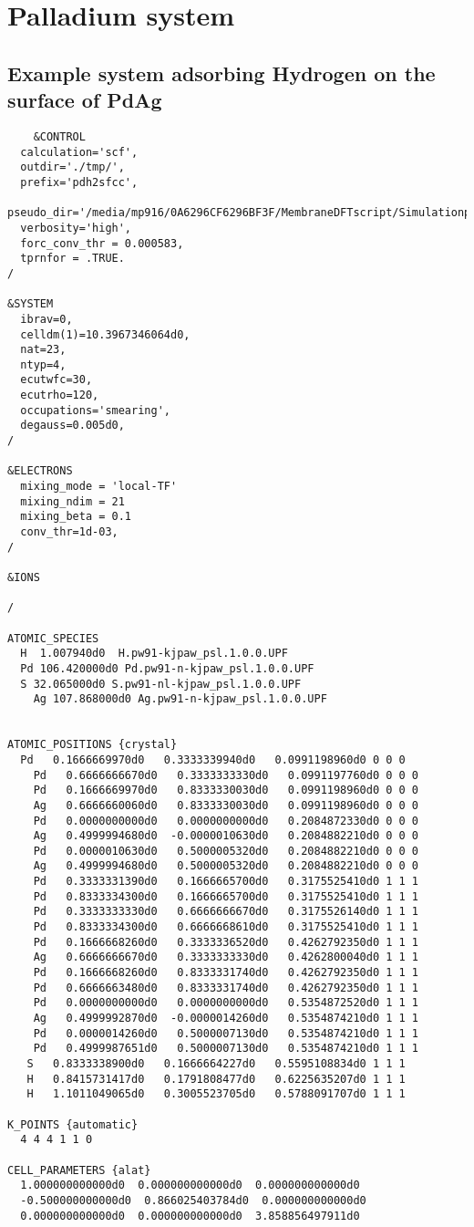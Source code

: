 \section{Palladium system}
\subsection{Example system adsorbing Hydrogen on the surface of PdAg }
\begin{verbatim}
    &CONTROL
  calculation='scf',
  outdir='./tmp/',
  prefix='pdh2sfcc',
  pseudo_dir='/media/mp916/0A6296CF6296BF3F/MembraneDFTscript/Simulationpdpaper/Pseudo',
  verbosity='high',
  forc_conv_thr = 0.000583,
  tprnfor = .TRUE.
/

&SYSTEM
  ibrav=0,
  celldm(1)=10.3967346064d0,
  nat=23,
  ntyp=4,
  ecutwfc=30,
  ecutrho=120,
  occupations='smearing',
  degauss=0.005d0,
/

&ELECTRONS
  mixing_mode = 'local-TF'
  mixing_ndim = 21
  mixing_beta = 0.1
  conv_thr=1d-03,
/

&IONS

/

ATOMIC_SPECIES
  H  1.007940d0  H.pw91-kjpaw_psl.1.0.0.UPF
  Pd 106.420000d0 Pd.pw91-n-kjpaw_psl.1.0.0.UPF
  S 32.065000d0 S.pw91-nl-kjpaw_psl.1.0.0.UPF
    Ag 107.868000d0 Ag.pw91-n-kjpaw_psl.1.0.0.UPF


ATOMIC_POSITIONS {crystal}
  Pd   0.1666669970d0   0.3333339940d0   0.0991198960d0 0 0 0
    Pd   0.6666666670d0   0.3333333330d0   0.0991197760d0 0 0 0
    Pd   0.1666669970d0   0.8333330030d0   0.0991198960d0 0 0 0
    Ag   0.6666660060d0   0.8333330030d0   0.0991198960d0 0 0 0
    Pd   0.0000000000d0   0.0000000000d0   0.2084872330d0 0 0 0
    Ag   0.4999994680d0  -0.0000010630d0   0.2084882210d0 0 0 0
    Pd   0.0000010630d0   0.5000005320d0   0.2084882210d0 0 0 0
    Ag   0.4999994680d0   0.5000005320d0   0.2084882210d0 0 0 0
    Pd   0.3333331390d0   0.1666665700d0   0.3175525410d0 1 1 1 
    Pd   0.8333334300d0   0.1666665700d0   0.3175525410d0 1 1 1
    Pd   0.3333333330d0   0.6666666670d0   0.3175526140d0 1 1 1
    Pd   0.8333334300d0   0.6666668610d0   0.3175525410d0 1 1 1 
    Pd   0.1666668260d0   0.3333336520d0   0.4262792350d0 1 1 1
    Ag   0.6666666670d0   0.3333333330d0   0.4262800040d0 1 1 1
    Pd   0.1666668260d0   0.8333331740d0   0.4262792350d0 1 1 1
    Pd   0.6666663480d0   0.8333331740d0   0.4262792350d0 1 1 1
    Pd   0.0000000000d0   0.0000000000d0   0.5354872520d0 1 1 1
    Ag   0.4999992870d0  -0.0000014260d0   0.5354874210d0 1 1 1
    Pd   0.0000014260d0   0.5000007130d0   0.5354874210d0 1 1 1
    Pd   0.4999987651d0   0.5000007130d0   0.5354874210d0 1 1 1 
   S   0.8333338900d0   0.1666664227d0   0.5595108834d0 1 1 1
   H   0.8415731417d0   0.1791808477d0   0.6225635207d0 1 1 1
   H   1.1011049065d0   0.3005523705d0   0.5788091707d0 1 1 1

K_POINTS {automatic}
  4 4 4 1 1 0

CELL_PARAMETERS {alat}
  1.000000000000d0  0.000000000000d0  0.000000000000d0
  -0.500000000000d0  0.866025403784d0  0.000000000000d0
  0.000000000000d0  0.000000000000d0  3.858856497911d0
\end{verbatim}

